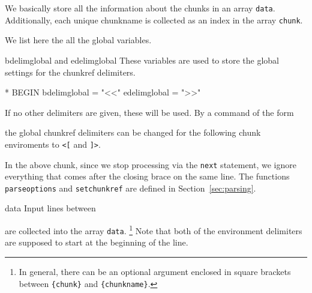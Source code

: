 \documentclass[a4paper]{article} %
\newenvironment{ttdescription}
  {\list{}{\labelwidth0pt \itemindent-\leftmargin
      \def\makelabel##1{\hspace\labelsep
        \normalfont\ttfamily ##1:}}}
  {\endlist}
\begin{document}
We basically store all the information about the chunks in an array
\texttt{data}. Additionally, each unique chunkname is collected as an
index in the array \texttt{chunk}.

We list here the all the global variables.
\begin{ttdescription}
\item[bdelimglobal \textrm{and} edelimglobal] These variables are used
  to store the global settings for the chunkref delimiters.
\begin{chunk}{*}
BEGIN {
  bdelimglobal = "<<"
  edelimglobal = ">>"
}
\end{chunk}
If no other delimiters are given, these will be used. 
By a command of the form
\begin{myverbatim}
\end{myverbatim}
the global chunkref delimiters can be changed for the following chunk
enviroments to \texttt{<[} and \texttt{]>}.
\begin{chunk}{*}
/^\\lstset{/ {
  lineidx = 8 # start parsing after "\lstset{"
  if (parseoptions() != "}") {error("Expected closing brace")}#$
  if (setchunkref()) {bdelimglobal = bdelim; edelimglobal = edelim}
  next
}
\end{chunk}
In the above chunk, since we stop processing via the \texttt{next}
statement, we ignore everything that comes after the closing brace on
the same line. The functions \texttt{parseoptions} and
\texttt{setchunkref} are defined in Section~\ref{sec:parsing}.

\item[data] Input lines between
\begin{myverbatim}
\end{myverbatim}
are collected into the array \texttt{data}.%
\footnote{In general, there can be an optional argument enclosed in
  square brackets between \texttt{\{chunk\}} and
  \texttt{\{chunkname\}}.}
%
Note that both of the environment delimiters are supposed to start at
the beginning of the line.


\end{ttdescription}
\end{document}
